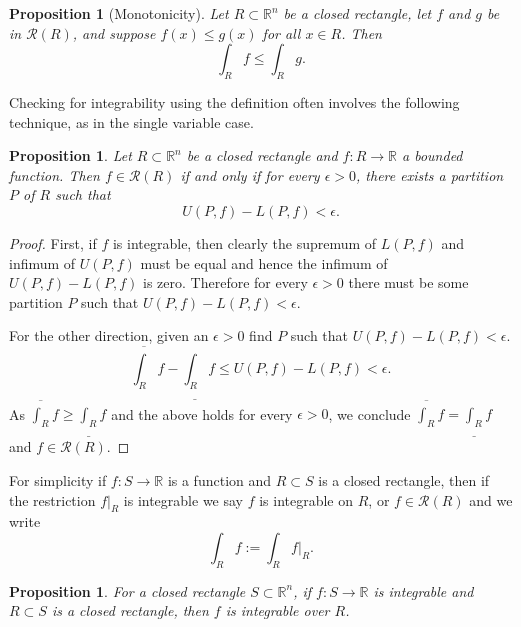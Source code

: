 \documentclass[12pt]{book}
\newcommand{\R}{{\mathbb{R}}}
\newcommand{\sR}{{\mathcal{R}}}
\theoremstyle{plain}
\newtheorem{prop}[thm]{Proposition}
\theoremstyle{remark}
\theoremstyle{definition}
\theoremstyle{exercise}
\theoremstyle{example}
\begin{document}
\begin{prop}[Monotonicity]
Let $R \subset \R^n$ be a closed rectangle, let
$f$ and $g$ be in $\sR(R)$, and suppose $f(x) \leq g(x)$
for all $x \in R$.  Then
\begin{equation*}
\int_R f 
\leq
\int_R g .
\end{equation*}
\end{prop}

Checking for integrability using the definition often involves the following
technique, as in the single variable case.

\begin{prop} \label{mv:prop:upperlowerepsilon}
Let $R \subset \R^n$ be a closed rectangle and
$f \colon R \to \R$ a bounded function.
Then $f \in \sR(R)$ if and only if
for every $\epsilon > 0$, there exists a partition $P$ of $R$
such that
\begin{equation*}
U(P,f) - L(P,f) < \epsilon .
\end{equation*}
\end{prop}

\begin{proof}
First, if $f$ is integrable, then clearly the supremum of $L(P,f)$ and
infimum of $U(P,f)$ must be equal and hence the
infimum of $U(P,f)-L(P,f)$ is zero.  Therefore for
every $\epsilon > 0$ there must be some partition $P$ such that 
$U(P,f) - L(P,f) < \epsilon$.

For the other direction, given an $\epsilon > 0$ find $P$ such that
$U(P,f) - L(P,f) < \epsilon$.
\begin{equation*}
\overline{\int_R} f - 
\underline{\int_R} f 
\leq
U(P,f) - L(P,f)
< \epsilon .
\end{equation*}
As $\overline{\int_R} f \geq \underline{\int_R} f$ and the above holds for
every $\epsilon > 0$, we conclude 
$\overline{\int_R} f = \underline{\int_R} f$ and $f \in \sR(R)$.
\end{proof}

For simplicity if $f \colon S \to \R$ is a function and $R \subset S$
is a closed rectangle, then if the restriction $f|_R$ is integrable we
say $f$ is integrable on $R$, or $f \in \sR(R)$ and we
write
\begin{equation*}
\int_R f := \int_R f|_R .
\end{equation*}

\begin{prop} \label{mv:prop:integralsmallerset}
For a closed rectangle $S \subset \R^n$,
if $f \colon S \to \R$ is integrable and $R \subset S$
is a closed rectangle, then $f$ is integrable over $R$.
\end{prop}
\end{document}
